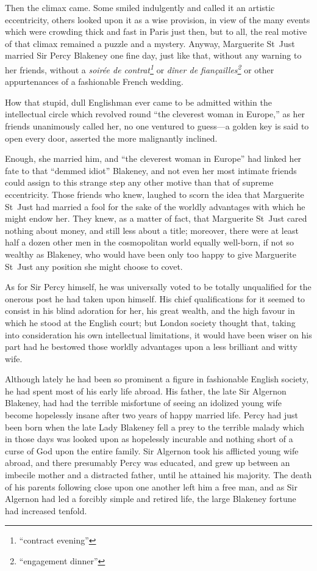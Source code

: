 Then the climax came. Some smiled indulgently and called it an artistic eccentricity, others looked upon it as a wise provision, in view of the many events which were crowding thick and fast in Paris just then, but to all, the real motive of that climax remained a puzzle and a mystery. Anyway, Marguerite St~Just married Sir Percy Blakeney one fine day, just like that, without any warning to her friends, without a \textit{soirée de contrat\footnote{\enquote{contract evening}}} or \textit{dîner de fiançailles\footnote{\enquote{engagement dinner}}} or other appurtenances of a fashionable French wedding.

How that stupid, dull Englishman ever came to be admitted within the intellectual circle which revolved round \enquote{the cleverest woman in Europe,} as her friends unanimously called her, no one ventured to guess---a golden key is said to open every door, asserted the more malignantly inclined.

Enough, she married him, and \enquote{the cleverest woman in Europe} had linked her fate to that \enquote{demmed idiot} Blakeney, and not even her most intimate friends could assign to this strange step any other motive than that of supreme eccentricity. Those friends who knew, laughed to scorn the idea that Marguerite St~Just had married a fool for the sake of the worldly advantages with which he might endow her. They knew, as a matter of fact, that Marguerite St~Just cared nothing about money, and still less about a title; moreover, there were at least half a dozen other men in the cosmopolitan world equally well-born, if not so wealthy as Blakeney, who would have been only too happy to give Marguerite St~Just any position she might choose to covet.

As for Sir Percy himself, he was universally voted to be totally unqualified for the onerous post he had taken upon himself. His chief qualifications for it seemed to consist in his blind adoration for her, his great wealth, and the high favour in which he stood at the English court; but London society thought that, taking into consideration his own intellectual limitations, it would have been wiser on his part had he bestowed those worldly advantages upon a less brilliant and witty wife.

Although lately he had been so prominent a figure in fashionable English society, he had spent most of his early life abroad. His father, the late Sir Algernon Blakeney, had had the terrible misfortune of seeing an idolized young wife become hopelessly insane after two years of happy married life. Percy had just been born when the late Lady Blakeney fell a prey to the terrible malady which in those days was looked upon as hopelessly incurable and nothing short of a curse of God upon the entire family. Sir Algernon took his afflicted young wife abroad, and there presumably Percy was educated, and grew up between an imbecile mother and a distracted father, until he attained his majority. The death of his parents following close upon one another left him a free man, and as Sir Algernon had led a forcibly simple and retired life, the large Blakeney fortune had increased tenfold.

